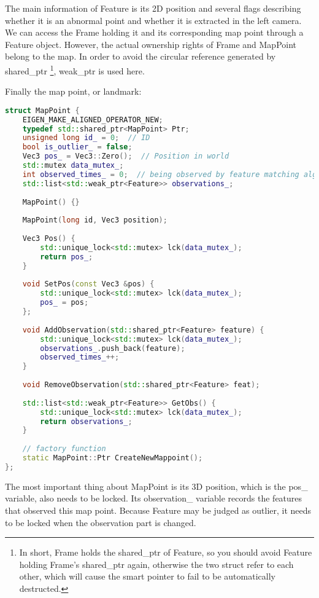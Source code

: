 The main information of Feature is its 2D position and several flags describing whether it is an abnormal point and whether it is extracted in the left camera. We can access the Frame holding it and its corresponding map point through a Feature object. However, the actual ownership rights of Frame and MapPoint belong to the map. In order to avoid the circular reference generated by shared\_ptr \footnote{In short, Frame holds the shared\_ptr of Feature, so you should avoid Feature holding Frame's  shared\_ptr again, otherwise the two struct refer to each other, which will cause the smart pointer to fail to be automatically destructed. }, weak\_ptr is used here.

Finally the map point, or landmark:
\begin{lstlisting}[language=c++,caption=slambook2/ch13/include/myslam/mappoint.h]
struct MapPoint {
	EIGEN_MAKE_ALIGNED_OPERATOR_NEW;
	typedef std::shared_ptr<MapPoint> Ptr;
	unsigned long id_ = 0;  // ID
	bool is_outlier_ = false;
	Vec3 pos_ = Vec3::Zero();  // Position in world
	std::mutex data_mutex_;
	int observed_times_ = 0;  // being observed by feature matching algo.
	std::list<std::weak_ptr<Feature>> observations_;
	
	MapPoint() {}
	
	MapPoint(long id, Vec3 position);
	
	Vec3 Pos() {
		std::unique_lock<std::mutex> lck(data_mutex_);
		return pos_;
	}
	
	void SetPos(const Vec3 &pos) {
		std::unique_lock<std::mutex> lck(data_mutex_);
		pos_ = pos;
	};
	
	void AddObservation(std::shared_ptr<Feature> feature) {
		std::unique_lock<std::mutex> lck(data_mutex_);
		observations_.push_back(feature);
		observed_times_++;
	}
	
	void RemoveObservation(std::shared_ptr<Feature> feat);
	
	std::list<std::weak_ptr<Feature>> GetObs() {
		std::unique_lock<std::mutex> lck(data_mutex_);
		return observations_;
	}
	
	// factory function
	static MapPoint::Ptr CreateNewMappoint();
};
\end{lstlisting}

The most important thing about MapPoint is its 3D position, which is the pos\_ variable, also needs to be locked. Its observation\_ variable records the features that observed this map point. Because Feature may be judged as outlier, it needs to be locked when the observation part is changed.

